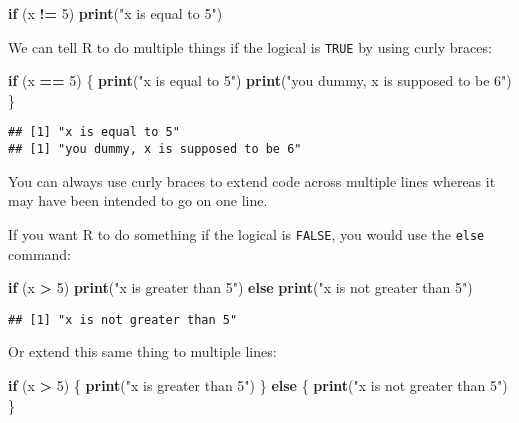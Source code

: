 \documentclass[]{book}
\newenvironment{Shaded}{\begin{snugshade}}{\end{snugshade}}
\newcommand{\KeywordTok}[1]{\textcolor[rgb]{0.13,0.29,0.53}{\textbf{#1}}}
\newcommand{\DecValTok}[1]{\textcolor[rgb]{0.00,0.00,0.81}{#1}}
\newcommand{\StringTok}[1]{\textcolor[rgb]{0.31,0.60,0.02}{#1}}
\newcommand{\ControlFlowTok}[1]{\textcolor[rgb]{0.13,0.29,0.53}{\textbf{#1}}}
\newcommand{\OperatorTok}[1]{\textcolor[rgb]{0.81,0.36,0.00}{\textbf{#1}}}
\newcommand{\NormalTok}[1]{#1}
\theoremstyle{definition}
\theoremstyle{definition}
\theoremstyle{definition}
\theoremstyle{remark}
\begin{document}
\begin{Shaded}
\begin{Highlighting}[]
\ControlFlowTok{if}\NormalTok{ (x }\OperatorTok{!=}\StringTok{ }\DecValTok{5}\NormalTok{) }\KeywordTok{print}\NormalTok{(}\StringTok{"x is equal to 5"}\NormalTok{)}
\end{Highlighting}
\end{Shaded}

We can tell R to do multiple things if the logical is \texttt{TRUE} by
using curly braces:

\begin{Shaded}
\begin{Highlighting}[]
\ControlFlowTok{if}\NormalTok{ (x }\OperatorTok{==}\StringTok{ }\DecValTok{5}\NormalTok{) \{}
  \KeywordTok{print}\NormalTok{(}\StringTok{"x is equal to 5"}\NormalTok{)}
  \KeywordTok{print}\NormalTok{(}\StringTok{"you dummy, x is supposed to be 6"}\NormalTok{)}
\NormalTok{\}}
\end{Highlighting}
\end{Shaded}

\begin{verbatim}
## [1] "x is equal to 5"
## [1] "you dummy, x is supposed to be 6"
\end{verbatim}

You can always use curly braces to extend code across multiple lines
whereas it may have been intended to go on one line.

If you want R to do something if the logical is \texttt{FALSE}, you
would use the \texttt{else} command:

\begin{Shaded}
\begin{Highlighting}[]
\ControlFlowTok{if}\NormalTok{ (x }\OperatorTok{>}\StringTok{ }\DecValTok{5}\NormalTok{) }\KeywordTok{print}\NormalTok{(}\StringTok{"x is greater than 5"}\NormalTok{) }\ControlFlowTok{else} \KeywordTok{print}\NormalTok{(}\StringTok{"x is not greater than 5"}\NormalTok{)}
\end{Highlighting}
\end{Shaded}

\begin{verbatim}
## [1] "x is not greater than 5"
\end{verbatim}

Or extend this same thing to multiple lines:

\begin{Shaded}
\begin{Highlighting}[]
\ControlFlowTok{if}\NormalTok{ (x }\OperatorTok{>}\StringTok{ }\DecValTok{5}\NormalTok{) \{}
  \KeywordTok{print}\NormalTok{(}\StringTok{"x is greater than 5"}\NormalTok{)}
\NormalTok{\} }\ControlFlowTok{else}\NormalTok{ \{}
  \KeywordTok{print}\NormalTok{(}\StringTok{"x is not greater than 5"}\NormalTok{)}
\NormalTok{\} }
\end{Highlighting}
\end{Shaded}
\end{document}
